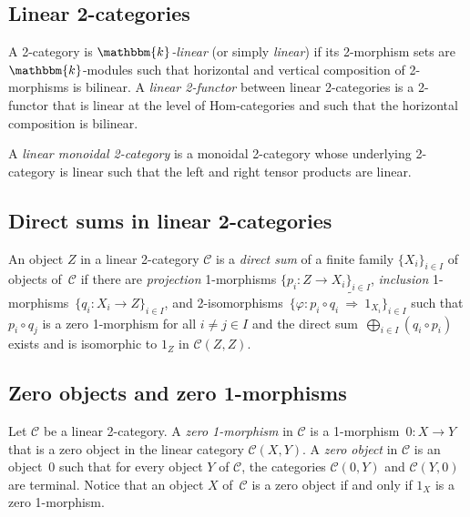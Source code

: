 \documentclass[a4paper, oneside]{amsart}
\numberwithin{equation}{subsection}
\theoremstyle{referencedlemma}
\theoremstyle{plain} %
\theoremstyle{remark}
\begin{document}
\subsection{Linear 2-categories} A 2-category is \emph{$\mathbbm{k}$-linear} (or simply \emph{linear}) if its 2-morphism sets are \mbox{$\mathbbm{k}$-mod}ules such that horizontal and vertical composition of 2-morphisms is bilinear. A \emph{linear 2-functor} between linear 2-categories is a 2-functor that is linear at the level of Hom-categories and such that the horizontal composition is bilinear.  

A \emph{linear monoidal 2-category} is a monoidal 2-category whose underlying 2-category is linear such that the left and right tensor products are linear. 

\subsection{Direct sums in linear 2-categories} An object $Z$ in a linear 2-category $\mathcal{C}$ is a \emph{direct sum} of a finite family $\{X_i\}_{i\in I}$ of objects of~$\mathcal{C}$ if there are \emph{projection} 1-morphisms $\{p_i \colon Z \to X_i\}_{i\in I}$, \emph{inclusion} \mbox{1-morphisms}~\mbox{$\{q_i \colon X_i\to Z\}_{i\in I}$}, and 2-iso\-morphisms~$\{\varphi\colon p_i\circ q_i\ \tilde{\Rightarrow}\ 1_{X_i}\}_{i\in I}$ such that $p_i\circ q_j$ is a zero 1-morphism for all $i\neq j \in I$ and the direct sum~$\bigoplus_{i\in I}(q_i \circ p_i)$ exists and is isomorphic to $1_Z$ in $\mathcal{C}(Z,Z)$. 

\subsection{Zero objects and zero 1-morphisms}

Let $\mathcal{C}$ be a linear 2-category. A \emph{zero 1-morphism} in $\mathcal{C}$ is a 1-morphism~\mbox{$0\colon X \to Y$} that is a zero object in the linear category $\mathcal{C}(X,Y)$.  A \emph{zero object} in $\mathcal{C}$ is an object~$0$ such that for every object $Y$ of $\mathcal{C}$, the categories $\mathcal{C}(0,Y)$ and $\mathcal{C}(Y,0)$ are terminal. Notice that an object $X$ of~$\mathcal{C}$ is a zero object if and only if $1_X$ is a zero 1-morphism.  
\end{document}
